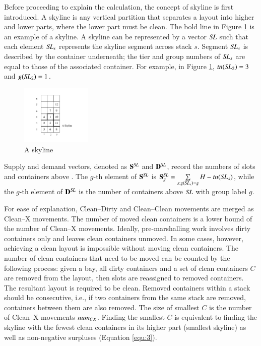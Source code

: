 \documentclass[review,3p,times,authoryear,12pt]{elsarticle}
\begin{document}
Before proceeding to explain the calculation, the concept of skyline is first introduced. A skyline is any vertical partition that separates a layout into higher and lower parts, where the lower part must be clean. The bold line in Figure \ref{fig5} is an example of a skyline. A skyline can be represented by a vector $\id{SL}$ such that each element $\id{SL}_s$ represents the skyline segment across stack $s$. Segment $\id{SL}_s$ is described by the container underneath; the tier and group numbers of $\id{SL}_s$ are equal to those of the associated container. For example, in Figure \ref{fig5}, $\id{tn}(\id{SL}_{2})=3$ and $g(\id{SL}_{2})=1$.


\begin{figure}[htbp]
\centering
\includegraphics[width=0.3\textwidth]{fig5.pdf}
\caption{A skyline}
\label{fig5}
\end{figure}

Supply and demand vectors, denoted as $\mathbf S^\id{SL}$ and $\mathbf D^\id{SL}$, record the numbers of slots and containers above . The $g$-th element of $\mathbf S^\id{SL}$ is $\mathbf S^\id{SL}_g=\sum\limits_{s:g(\id{SL}_s)=g}H-\id{tn}(\id{SL}_s)$, while the $g$-th element of $\mathbf D^\id{SL}$ is the number of containers above $\id{SL}$ with group label $g$.

For ease of explanation, Clean--Dirty and Clean--Clean movements are merged as Clean--X movements. The number of moved clean containers is a lower bound of the number of Clean--X movements. Ideally, pre-marshalling work involves dirty containers only and leaves clean containers unmoved. In some cases, however, achieving a clean layout is impossible without moving clean containers. The number of clean containers that need to be moved can be counted by the following process: given a bay, all dirty containers and a set of clean containers $C$ are removed from the layout, then slots are reassigned to removed containers. The resultant layout is required to be clean. Removed containers within a stack should be consecutive, i.e., if two containers from the same stack are removed, containers between them are also removed. The size of smallest $C$ is the number of Clean--X movements $\id{num}_{CX}$. Finding the smallest $C$ is equivalent to finding the skyline with the fewest clean containers in its higher part (smallest skyline) as well as non-negative surpluses (Equation \ref{equ:3}).
\end{document}
